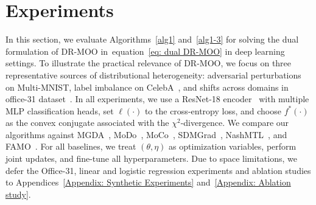 \documentclass[twoside]{article} %
\def\eqref#1{equation~\ref{#1}}
\theoremstyle{plain}
\theoremstyle{definition}
\theoremstyle{remark}
\begin{document}
\section{Experiments}
In this section, we evaluate Algorithms~\ref{alg1} and~\ref{alg1-3} for solving the dual formulation of DR-MOO in~\eqref{eq: dual DR-MOO} in deep learning settings. To illustrate the practical relevance of DR-MOO, we focus on three representative sources of distributional heterogeneity: adversarial perturbations on Multi-MNIST\citep{mnist}, label imbalance on CelebA~\citep{celebA}, and shifts across domains in office-31 dataset~\citep{officedata31}. In all experiments, we use a ResNet-18 encoder~\citep{ResNet} with multiple MLP classification heads, set $\ell(\cdot)$ to the cross-entropy loss, and choose $f^*(\cdot)$ as the convex conjugate associated with the $\chi^2$-divergence. We compare our algorithms against MGDA~\citep{MGDA1stwork,stochasticMGDA}, MoDo~\citep{MODO}, MoCo~\citep{MOCO}, SDMGrad~\citep{SDMkaiyiJi}, NashMTL~\citep{nashMTL}, and FAMO~\citep{FAMO}. For all baselines, we treat \((\theta,\eta)\) as optimization variables, perform joint updates, and fine-tune all hyperparameters. Due to space limitations, we defer the Office-31, linear and logistic regression experiments and ablation studies to Appendices~\ref{Appendix: Synthetic Experiments} and~\ref{Appendix: Ablation study}.

\vspace{-1em}
\end{document}
